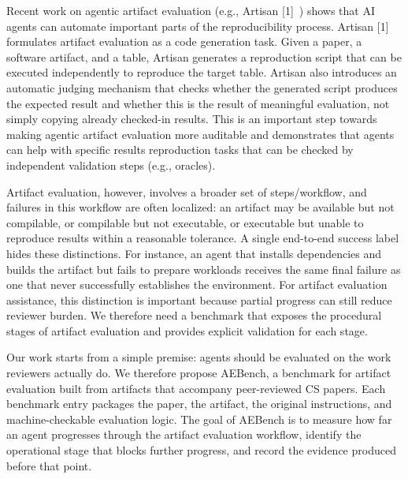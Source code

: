 Recent work on agentic artifact evaluation (e.g., Artisan [1]~) shows that AI agents can automate important parts of the reproducibility process. Artisan [1] formulates artifact evaluation as a code generation task. Given a paper, a software artifact, and a table, Artisan generates a reproduction script that can be executed independently to reproduce the target table. Artisan also introduces an automatic judging mechanism that checks whether the generated script produces the expected result and whether this is the result of meaningful evaluation, not simply copying already checked-in results. This is an important step towards making agentic artifact evaluation more auditable and demonstrates that agents can help with specific results reproduction tasks that can be checked by independent validation steps (e.g., oracles).

Artifact evaluation, however, involves a broader set of steps/workflow, and failures in this workflow are often localized: an artifact may be available but not compilable, or compilable but not executable, or executable but unable to reproduce results within a reasonable tolerance. A single end-to-end success label hides these distinctions. For instance, an agent that installs dependencies and builds the artifact but fails to prepare workloads receives the same final failure as one that never successfully establishes the environment. For artifact evaluation assistance, this distinction is important because partial progress can still reduce reviewer burden. We therefore need a benchmark that exposes the procedural stages of artifact evaluation and provides explicit validation for each stage.

Our work starts from a simple premise: agents should be evaluated on the work reviewers actually do. We therefore propose AEBench, a benchmark for artifact evaluation built from artifacts that accompany peer-reviewed CS papers. Each benchmark entry packages the paper, the artifact, the original instructions, and machine-checkable evaluation logic. The goal of AEBench is to measure how far an agent progresses through the artifact evaluation workflow, identify the operational stage that blocks further progress, and record the evidence produced before that point.

